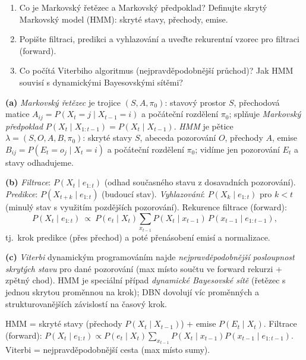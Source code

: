 \begin{zadani}
\begin{enumerate}[label=(\alph*)]
  \item {} Co je Markovský řetězec a Markovský předpoklad? Definujte skrytý Markovský model (HMM): skryté stavy, přechody, emise.
  \item {} Popište filtraci, predikci a vyhlazování a uveďte rekurentní vzorec pro filtraci (forward).
  \item {} Co počítá Viterbiho algoritmus (nejpravděpodobnější průchod)? Jak HMM souvisí s dynamickými Bayesovskými sítěmi?
\end{enumerate}
\end{zadani}

\begin{reseni}
\textbf{(a)} \emph{Markovský řetězec} je trojice $(S,A,\pi_0)$: stavový prostor $S$, přechodová matice $A_{ij}=P(X_t{=}j\mid X_{t-1}{=}i)$ a počáteční rozdělení $\pi_0$; splňuje \emph{Markovský předpoklad} $P(X_t\mid X_{1:t-1})=P(X_t\mid X_{t-1})$. \emph{HMM} je pětice $\lambda=(S,O,A,B,\pi_0)$: skryté stavy $S$, abeceda pozorování $O$, přechody $A$, emise $B_{ij}=P(E_t{=}o_j\mid X_t{=}i)$ a počáteční rozdělení $\pi_0$; vidíme jen pozorování $E_t$ a stavy odhadujeme.

\textbf{(b)} \emph{Filtrace}: $P(X_t\mid e_{1:t})$ (odhad současného stavu z dosavadních pozorování). \emph{Predikce}: $P(X_{t+k}\mid e_{1:t})$ (budoucí stav). \emph{Vyhlazování}: $P(X_k\mid e_{1:t})$ pro $k<t$ (minulý stav s využitím pozdějších pozorování). Rekurence filtrace (forward):
\[
P(X_t\mid e_{1:t})\ \propto\ P(e_t\mid X_t)\sum_{x_{t-1}}P(X_t\mid x_{t-1})\,P(x_{t-1}\mid e_{1:t-1}),
\]
tj.\ krok predikce (přes přechod) a poté přenásobení emisí a normalizace.

\textbf{(c)} \emph{Viterbi} dynamickým programováním najde \emph{nejpravděpodobnější posloupnost skrytých stavu} pro dané pozorování (max místo součtu ve forward rekurzi + zpětný chod). HMM je speciální případ \emph{dynamické Bayesovské sítě} (řetězec s jednou skrytou proměnnou na krok); DBN dovolují víc proměnných a strukturovanějších závislostí na časový krok.
\end{reseni}

\begin{jadro}
HMM = skryté stavy (přechody $P(X_t\mid X_{t-1})$) + emise $P(E_t\mid X_t)$. Filtrace (forward): $P(X_t\mid e_{1:t})\propto P(e_t\mid X_t)\sum_{x_{t-1}}P(X_t\mid x_{t-1})P(x_{t-1}\mid e_{1:t-1})$. Viterbi = nejpravděpodobnější cesta (max místo sumy).
\end{jadro}

